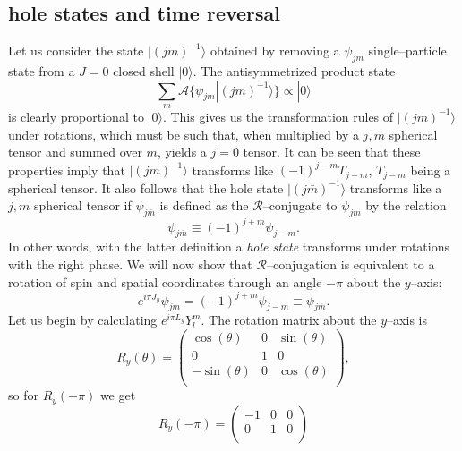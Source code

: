 \begin{subappendices}
\section{hole states and time reversal}\label{C7AppM}
Let us consider the state $|(jm)^{-1}\rangle$ obtained by removing a $\psi_{jm}$ single--particle state from a $J=0$ closed shell $|0\rangle$. The antisymmetrized product state
 \begin{equation}\label{eq37}
\sum_m \mathcal{A}\{\psi_{jm}|(jm)^{-1}\rangle\} \propto |0\rangle
\end{equation}
is clearly proportional to $|0\rangle$. This gives us the transformation rules of  $|(jm)^{-1}\rangle$ under rotations, which must be such that, when multiplied by a $j,m$ spherical tensor and summed over $m$, yields a $j=0$ tensor. It can be seen that these properties imply that $|(jm)^{-1}\rangle$ transforms like $(-1)^{j-m}T_{j-m}$, $T_{j-m}$ being a spherical tensor. It also follows that the hole state $|(j\bar m)^{-1}\rangle$ transforms like a $j,m$ spherical tensor if $\psi_{j\bar m}$ is defined as the $\mathcal{R}$--conjugate to $\psi_{j m}$ by the relation
 \begin{equation}\label{eq38}
\psi_{j\bar m} \equiv  (-1)^{j+m} \psi_{j-m}.
\end{equation}
In other words, with the latter definition a \emph{hole state} transforms under rotations with the right phase.
We will now show that $\mathcal{R}$--conjugation is equivalent to a rotation of spin and spatial coordinates through an angle $-\pi$ about the $y$--axis:
 \begin{equation}\label{eq39}
e^{i\pi J_y} \psi_{jm}=(-1)^{j+m}\psi_{j-m}\equiv \psi_{j\bar m}.
\end{equation}
Let us begin by calculating $e^{i\pi L_y} Y_l^m$. The rotation matrix about the $y$--axis is
 \begin{equation}\label{eq40}
 R_y(\theta)=
\begin{pmatrix}
  \cos(\theta) & 0 & \sin(\theta) \\
  0& 1 & 0 \\
  -\sin(\theta) & 0 & \cos(\theta) \\
\end{pmatrix},
\end{equation}
so for $R_y(-\pi)$ we get
 \begin{equation}\label{eq41}
 R_y(-\pi)=
\begin{pmatrix}
  -1 & 0 & 0 \\
  0& 1 & 0 \\

\end{pmatrix}
\end{equation}
\end{subappendices}
